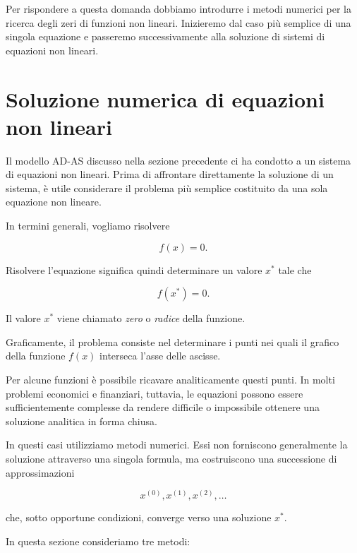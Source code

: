 Per rispondere a questa domanda dobbiamo introdurre i metodi numerici
per la ricerca degli zeri di funzioni non lineari. Inizieremo dal
caso più semplice di una singola equazione e passeremo successivamente
alla soluzione di sistemi di equazioni non lineari.

\section{Soluzione numerica di equazioni non lineari}
\label{sec:equazioni-nonlineari}

Il modello AD-AS discusso nella sezione precedente ci ha condotto a
un sistema di equazioni non lineari. Prima di affrontare direttamente
la soluzione di un sistema, è utile considerare il problema più
semplice costituito da una sola equazione non lineare.

In termini generali, vogliamo risolvere

\begin{equation*}
    f(x)=0.
    \label{eq:nonlinear_scalar}
\end{equation*}

Risolvere l'equazione significa quindi determinare un valore $x^*$
tale che

\begin{equation*}
    f(x^*)=0.
\end{equation*}

Il valore $x^*$ viene chiamato \emph{zero} o \emph{radice} della
funzione.

Graficamente, il problema consiste nel determinare i punti nei quali
il grafico della funzione $f(x)$ interseca l'asse delle ascisse.

Per alcune funzioni è possibile ricavare analiticamente questi punti.
In molti problemi economici e finanziari, tuttavia, le equazioni
possono essere sufficientemente complesse da rendere difficile o
impossibile ottenere una soluzione analitica in forma chiusa.

In questi casi utilizziamo metodi numerici. Essi non forniscono
generalmente la soluzione attraverso una singola formula, ma
costruiscono una successione di approssimazioni

\begin{equation*}
    x^{(0)},x^{(1)},x^{(2)},\ldots
\end{equation*}

che, sotto opportune condizioni, converge verso una soluzione $x^*$.

In questa sezione consideriamo tre metodi:

